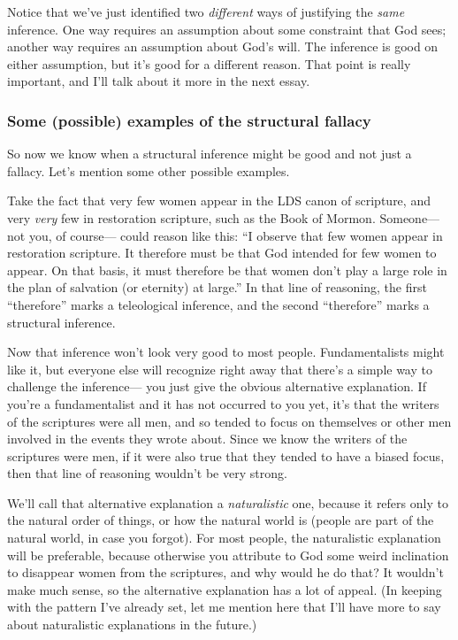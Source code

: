 		Notice that we've just identified two \textit{different} ways of justifying the \textit{same} inference.
		One way requires an assumption about some constraint that God sees;
			another way requires an assumption about God's will.
		The inference is good on either assumption,
			but it's good for a different reason.
		That point is really important,
			and I'll talk about it more in the next essay.
	
	\subsubsection{Some (possible) examples of the structural fallacy}
	
		So now we know when a structural inference might be good and not just a fallacy.
		Let's mention some other possible examples.
		
		Take the fact that very few women appear in the LDS canon of scripture,
			and very \textit{very} few in restoration scripture,
				such as the Book of Mormon.
		Someone---%
			not you,
				of course---%
					could reason like this:
						``I observe that few women appear in restoration scripture.
		It therefore must be that God intended for few women to appear.
		On that basis,
			it must therefore be that women don't play a large role in the plan of salvation (or eternity) at large.''
		In that line of reasoning,
			the first ``therefore'' marks a teleological inference,
				and the second ``therefore'' marks a structural inference.
				
		Now that inference won't look very good to most people.
		Fundamentalists might like it,
			but everyone else will recognize right away that there's a simple way to challenge the inference---%
				you just give the obvious alternative explanation.
		If you're a fundamentalist and it has not occurred to you yet,
			it's that the writers of the scriptures were all men,
				and so tended to focus on themselves or other men involved in the events they wrote about.
		Since we know the writers of the scriptures were men,
			if it were also true that they tended to have a biased focus,
				then that line of reasoning wouldn't be very strong.
				
		We'll call that alternative explanation a \textit{naturalistic} one,
			because it refers only to the natural order of things,
				or how the natural world is (people are part of the natural world,
					in case you forgot).
		For most people,
			the naturalistic explanation will be preferable,
				because otherwise you attribute to God some weird inclination to disappear women from the scriptures,
					and why would he do that?
		It wouldn't make much sense,
			so the alternative explanation has a lot of appeal.
		(In keeping with the pattern I've already set,
			let me mention here that I'll have more to say about naturalistic explanations in the future.)
			

